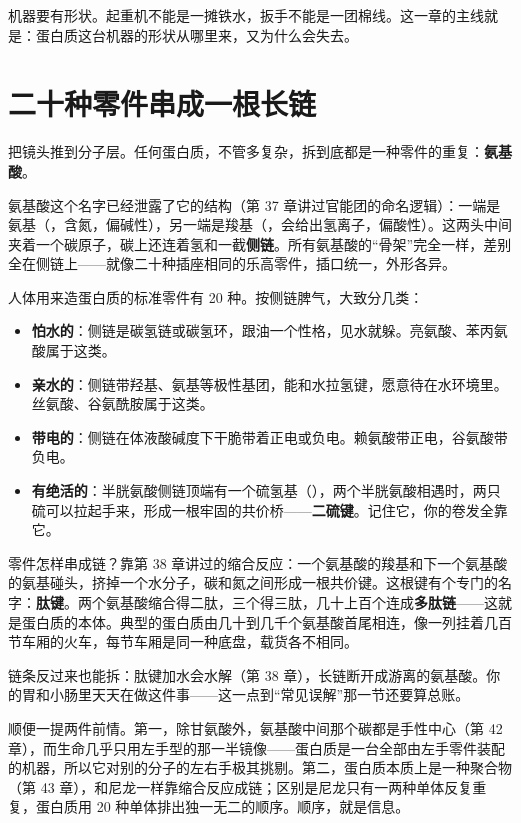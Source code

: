 机器要有形状。起重机不能是一摊铁水，扳手不能是一团棉线。这一章的主线就是：蛋白质这台机器的形状从哪里来，又为什么会失去。

\section{二十种零件串成一根长链}

把镜头推到分子层。任何蛋白质，不管多复杂，拆到底都是一种零件的重复：\textbf{氨基酸}。

氨基酸这个名字已经泄露了它的结构（第 37 章讲过官能团的命名逻辑）：一端是氨基（，含氮，偏碱性），另一端是羧基（，会给出氢离子，偏酸性）。这两头中间夹着一个碳原子，碳上还连着氢和一截\textbf{侧链}。所有氨基酸的“骨架”完全一样，差别全在侧链上——就像二十种插座相同的乐高零件，插口统一，外形各异。

人体用来造蛋白质的标准零件有 20 种。按侧链脾气，大致分几类：

\begin{itemize}[itemsep=2pt]
\item \textbf{怕水的}：侧链是碳氢链或碳氢环，跟油一个性格，见水就躲。亮氨酸、苯丙氨酸属于这类。
\item \textbf{亲水的}：侧链带羟基、氨基等极性基团，能和水拉氢键，愿意待在水环境里。丝氨酸、谷氨酰胺属于这类。
\item \textbf{带电的}：侧链在体液酸碱度下干脆带着正电或负电。赖氨酸带正电，谷氨酸带负电。
\item \textbf{有绝活的}：半胱氨酸侧链顶端有一个硫氢基（），两个半胱氨酸相遇时，两只硫可以拉起手来，形成一根牢固的共价桥——\textbf{二硫键}。记住它，你的卷发全靠它。
\end{itemize}

零件怎样串成链？靠第 38 章讲过的缩合反应：一个氨基酸的羧基和下一个氨基酸的氨基碰头，挤掉一个水分子，碳和氮之间形成一根共价键。这根键有个专门的名字：\textbf{肽键}。两个氨基酸缩合得二肽，三个得三肽，几十上百个连成\textbf{多肽链}——这就是蛋白质的本体。典型的蛋白质由几十到几千个氨基酸首尾相连，像一列挂着几百节车厢的火车，每节车厢是同一种底盘，载货各不相同。

链条反过来也能拆：肽键加水会水解（第 38 章），长链断开成游离的氨基酸。你的胃和小肠里天天在做这件事——这一点到“常见误解”那一节还要算总账。

顺便一提两件前情。第一，除甘氨酸外，氨基酸中间那个碳都是手性中心（第 42 章），而生命几乎只用左手型的那一半镜像——蛋白质是一台全部由左手零件装配的机器，所以它对别的分子的左右手极其挑剔。第二，蛋白质本质上是一种聚合物（第 43 章），和尼龙一样靠缩合反应成链；区别是尼龙只有一两种单体反复重复，蛋白质用 20 种单体排出独一无二的顺序。顺序，就是信息。

